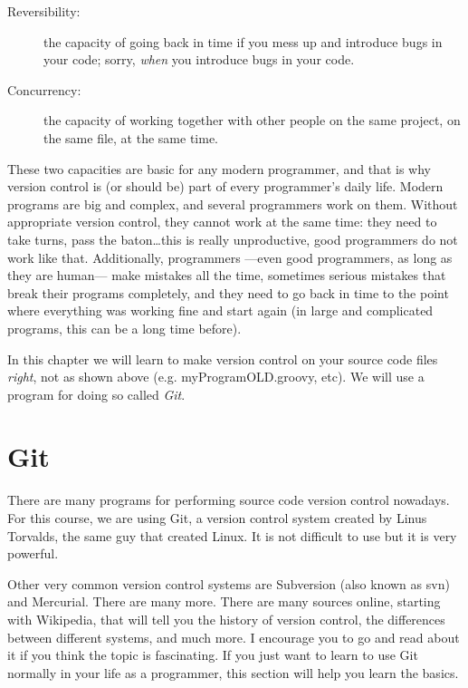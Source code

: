 \begin{description}
\item[Reversibility: ] the capacity of going back in time if you mess
  up and introduce bugs in your code; sorry, \emph{when} you introduce
  bugs in your code.
\item[Concurrency: ] the capacity of working together with other
  people on the same project, on the same file, at the same time. 
\end{description}

These two capacities are basic for any modern programmer, and that is
why version control is (or should be) part of every programmer's daily
life. Modern programs are big and complex, and several programmers
work on them. Without appropriate version control, they cannot work at
the same time: they need to take turns, pass the baton\ldots this is
really unproductive, good programmers do not work like
that. Additionally, programmers ---even good programmers, as long as
they are human--- make mistakes all the time, sometimes serious
mistakes that break their programs completely, and they need to go
back in time to the point where everything was working fine and start
again (in large and complicated programs, this can be a long time
before).

In this chapter we will learn to make version control on your source
code files \emph{right}, not as shown above (e.g. myProgramOLD.groovy,
etc). We will use a program for doing so called \emph{Git}.

\section{Git}
\label{sec:git}

There are many programs for performing source code version control
nowadays. For this course, we are using Git, a version control system
created by Linus Torvalds, the same guy that created Linux. It is not
difficult to use but it is very powerful. 

Other very common version control systems are Subversion (also known
as svn) and Mercurial. There are many more. There are many sources
online, starting with Wikipedia, that will tell you the history of
version control, the differences between different systems, and much
more. I encourage you to go and read about it if you think the topic
is fascinating. If you just want to learn to use Git normally in
your life as a programmer, this section will help you learn the
basics. 


